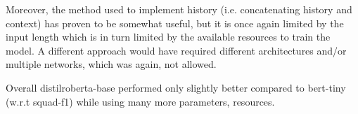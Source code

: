 \documentclass[11pt]{article}
\begin{document}
Moreover, the method used to implement history (i.e. concatenating history and context) has proven to be somewhat useful, but it is once again limited by the input length which is in turn limited by the available resources to train the model. A different approach would have required different architectures and/or multiple networks, which was again, not allowed.

Overall distilroberta-base performed only slightly better compared to bert-tiny (w.r.t squad-f1) while using many more parameters, resources.







\end{document}

